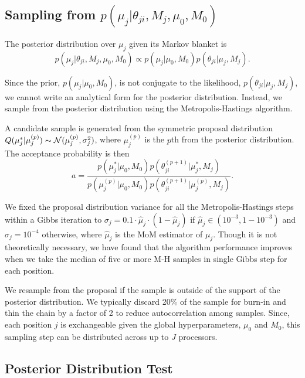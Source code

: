 \documentclass{bioinfo}
\begin{document}
\subsection{Sampling from $p \left( \mu_j |\theta_{ji},M_j,\mu_0,M_0\right)$}
The posterior distribution over $\mu_j$ given its Markov blanket is
\begin{equation}
	p( \mu_j | \theta_{ji}, M_j, \mu_0, M_0 ) \propto p(\mu_j | \mu_0, M_0) p(\theta_{ji} | \mu_j, M_j).
\end{equation}

Since the prior, $p(\mu_j | \mu_0, M_0)$, is not conjugate to the likelihood, $p(\theta_{ji} | \mu_j, M_j)$, we cannot write an analytical form for the posterior distribution. Instead, we sample from the posterior distribution using the Metropolis-Hastings algorithm.

A candidate sample is generated from the symmetric proposal distribution $Q(\mu_j^* | \mu_j^{(p)}) \thicksim \mathcal{N}(\mu_j^{(p)}, \sigma_j^2)$, where $\mu_j^{(p)}$ is the $p$th from the posterior distribution. The acceptance probability is then
\begin{equation}
	a = \frac{ p(\mu_j^* | \mu_0, M_0) p(\theta^{(p+1)}_{ji} | \mu_j^*, M_j) } {p(\mu_j^{(p)} | \mu_0, M_0) p(\theta^{(p+1)}_{ji} | \mu_j^{(p)}, M_j)}.
\end{equation}

We fixed the proposal distribution variance for all the Metropolis-Hastings steps within a Gibbs iteration to $\sigma_j = 0.1 \cdot \hat{\mu}_j\cdot (1-\hat{\mu}_j)$ if $\hat{\mu}_j \in (10^{-3},1-10^{-3})$ and $\sigma_j = 10^{-4}$ otherwise, where $\hat{\mu}_j$ is the MoM estimator of $\mu_j$. Though it is not theoretically necessary, we have found that the algorithm performance improves when we take the median of five or more M-H samples in single Gibbs step for each position.


We resample from the proposal if the sample is outside of the support of the posterior distribution. We typically discard 20\% of the sample for burn-in and thin the chain by a factor of 2 to reduce autocorrelation among samples. Since, each position $j$ is exchangeable given the global hyperparameters, $\mu_0$ and $M_0$, this sampling step can be distributed across up to $J$ processors.

\subsection{Posterior Distribution Test}\label{sec:hypothesis_test}
\end{document}
